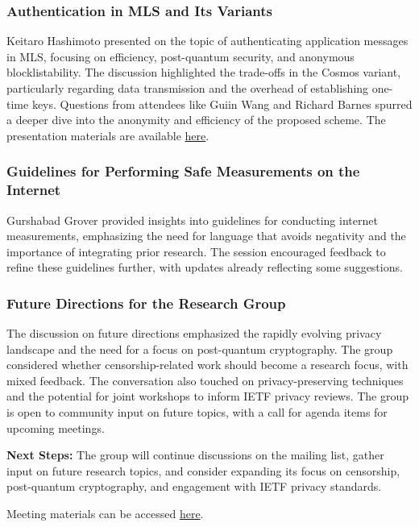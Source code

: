\documentclass{article}
\begin{document}
\subsubsection{Authentication in MLS and Its Variants}
Keitaro Hashimoto presented on the topic of authenticating application messages in MLS, focusing on efficiency, post-quantum security, and anonymous blocklistability. The discussion highlighted the trade-offs in the Cosmos variant, particularly regarding data transmission and the overhead of establishing one-time keys. Questions from attendees like Guiin Wang and Richard Barnes spurred a deeper dive into the anonymity and efficiency of the proposed scheme. The presentation materials are available \href{https://datatracker.ietf.org/meeting/122/materials/slides-122-pearg-authentication-in-mls-ietf122-v7-00}{here}.

\subsubsection{Guidelines for Performing Safe Measurements on the Internet}
Gurshabad Grover provided insights into guidelines for conducting internet measurements, emphasizing the need for language that avoids negativity and the importance of integrating prior research. The session encouraged feedback to refine these guidelines further, with updates already reflecting some suggestions.

\subsubsection{Future Directions for the Research Group}
The discussion on future directions emphasized the rapidly evolving privacy landscape and the need for a focus on post-quantum cryptography. The group considered whether censorship-related work should become a research focus, with mixed feedback. The conversation also touched on privacy-preserving techniques and the potential for joint workshops to inform IETF privacy reviews. The group is open to community input on future topics, with a call for agenda items for upcoming meetings.

\textbf{Next Steps:} The group will continue discussions on the mailing list, gather input on future research topics, and consider expanding its focus on censorship, post-quantum cryptography, and engagement with IETF privacy standards.

Meeting materials can be accessed \href{https://datatracker.ietf.org/doc/minutes-122-pearg/}{here}.
\end{document}
